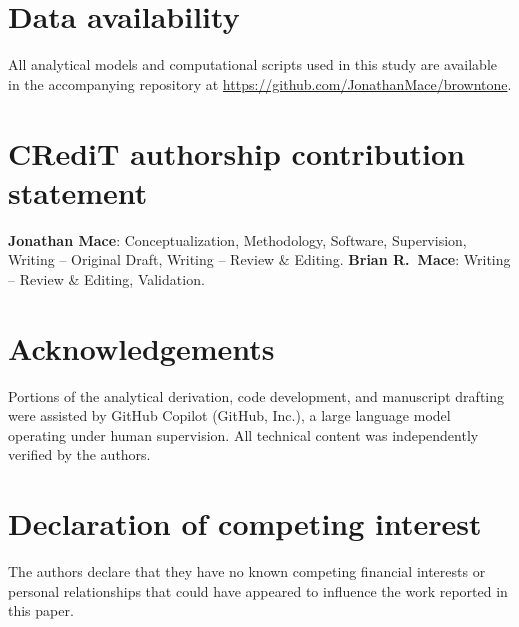 \documentclass[review]{elsarticle}
\begin{document}







\section*{Data availability}
All analytical models and computational scripts used in this study are
available in the accompanying repository at
\url{https://github.com/JonathanMace/browntone}.

\section*{CRediT authorship contribution statement}
\textbf{Jonathan Mace}: Conceptualization, Methodology, Software, Supervision,
Writing -- Original Draft, Writing -- Review \& Editing.
\textbf{Brian R.\ Mace}: Writing -- Review \& Editing, Validation.

\section*{Acknowledgements}
Portions of the analytical derivation, code development, and manuscript
drafting were assisted by GitHub Copilot (GitHub, Inc.), a large language
model operating under human supervision.  All technical content was
independently verified by the authors.

\section*{Declaration of competing interest}
The authors declare that they have no known competing financial interests
or personal relationships that could have appeared to influence the work
reported in this paper.
\end{document}
